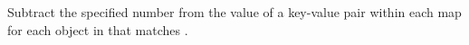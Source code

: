 Subtract the specified number from the value of a key-value pair within each
map for each object in  that matches .


